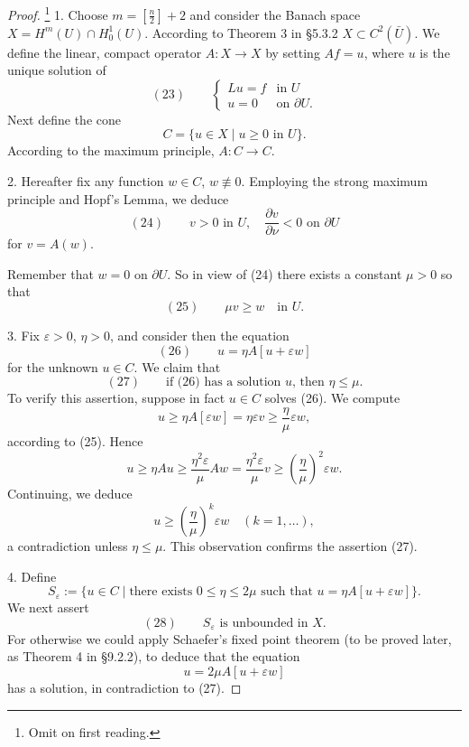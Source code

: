 \begin{proof}
\footnote{Omit on first reading.}
1. Choose $m = \left[\frac n2\right]+2$ and consider the Banach space $X = H^m(U) \cap H_0^1(U)$. According to Theorem 3 in \S5.3.2 $X \subset C^2(\bar U)$. We define the linear, compact operator $A : X \to X$ by setting $Af = u$, where $u$ is the unique solution of
$$(23) \qquad \begin{cases} Lu = f & \text{in } U \\ u = 0 & \text{on } \partial U. \end{cases}$$
Next define the cone
$$C = \{u \in X \mid u \geq 0 \text{ in } U\}.$$
According to the maximum principle, $A : C \to C$.

2. Hereafter fix any function $w \in C$, $w \not\equiv 0$. Employing the strong maximum principle and Hopf's Lemma, we deduce
$$(24) \qquad v > 0 \text{ in } U, \quad \frac{\partial v}{\partial\nu} < 0 \text{ on } \partial U$$
for $v = A(w)$.

Remember that $w = 0$ on $\partial U$. So in view of (24) there exists a constant $\mu > 0$ so that
$$(25) \qquad \mu v \geq w \quad \text{in } U.$$

3. Fix $\varepsilon > 0$, $\eta > 0$, and consider then the equation
$$(26) \qquad u = \eta A[u+\varepsilon w]$$
for the unknown $u \in C$. We claim that
$$(27) \qquad \text{if (26) has a solution } u\text{, then } \eta \leq \mu.$$
To verify this assertion, suppose in fact $u \in C$ solves (26). We compute
$$u \geq \eta A[\varepsilon w] = \eta\varepsilon v \geq \frac\eta\mu\varepsilon w,$$
according to (25). Hence
$$u \geq \eta Au \geq \frac{\eta^2\varepsilon}\mu Aw = \frac{\eta^2\varepsilon}\mu v \geq \left(\frac\eta\mu\right)^2\varepsilon w.$$
Continuing, we deduce
$$u \geq \left(\frac\eta\mu\right)^k\varepsilon w \quad (k=1,\ldots),$$
a contradiction unless $\eta \leq \mu$. This observation confirms the assertion (27).

4. Define
$$S_\varepsilon := \{u \in C \mid \text{there exists } 0 \leq \eta \leq 2\mu \text{ such that } u = \eta A[u+\varepsilon w]\}.$$
We next assert
$$(28) \qquad S_\varepsilon \text{ is unbounded in } X.$$
For otherwise we could apply Schaefer's fixed point theorem (to be proved later, as Theorem 4 in \S9.2.2), to deduce that the equation
$$u = 2\mu A[u+\varepsilon w]$$
has a solution, in contradiction to (27).


\end{proof}
